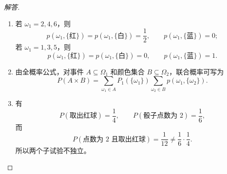 \begin{proof}[解答]
\begin{enumerate}
\item 若 $\omega_1=2,4,6$，则
\[
p(\omega_1,\{\text{红}\})=p(\omega_1,\{\text{白}\})=\frac12,
\qquad
p(\omega_1,\{\text{蓝}\})=0;
\]
若 $\omega_1=1,3,5$，则
\[
p(\omega_1,\{\text{红}\})=p(\omega_1,\{\text{白}\})=0,
\qquad
p(\omega_1,\{\text{蓝}\})=1.
\]
\item 由全概率公式，对事件 $A\subseteq\Omega_1$ 和颜色集合 $B\subseteq\Omega_2$，联合概率可写为
\[
P(A\times B)
=\sum_{\omega_1\in A}P_1(\{\omega_1\})
\sum_{\omega_2\in B}p(\omega_1,\{\omega_2\}).
\]
\item 有
\[
P(\text{取出红球})=\frac14,
\qquad
P(\text{骰子点数为 }2)=\frac16,
\]
而
\[
P(\text{点数为 }2\text{ 且取出红球})=\frac1{12}
\ne\frac16\cdot\frac14.
\]
所以两个子试验不独立。
\end{enumerate}
\end{proof}
